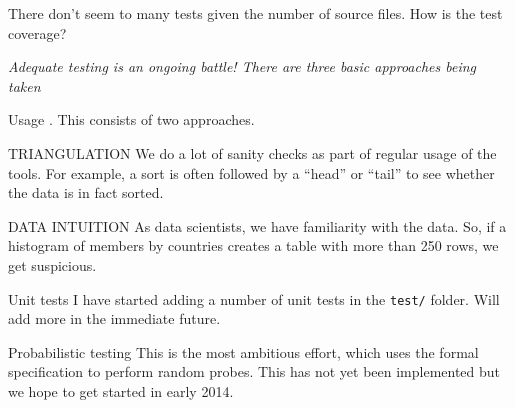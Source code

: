 \documentclass[letterpaper]{article}
\begin{document}
\item There don't seem to many tests given the number of source
files. How is the test coverage?

{\it Adequate testing is an ongoing battle! There are three basic
  approaches being taken
\bd
\item [Usage]. This consists of two approaches.
\bd
\item [TRIANGULATION] We do a lot of sanity checks as part
of regular usage of the tools. For example, a sort is often followed by
a ``head'' or ``tail'' to see whether the data is in fact sorted. 
\item [DATA INTUITION] As data scientists, we have familiarity with the
data. So, if a histogram of members by countries creates a table with more
than 250 rows, we get suspicious.
\ed
\item [Unit tests] I have started adding a number of unit tests in the
\verb+test/+ folder. Will add more in the immediate future.
\item [Probabilistic testing] This is the most ambitious effort, which
uses the formal specification to perform random probes. This has not yet
been implemented but we hope to get started in early 2014.
\ed

}
\ee
\end{document}

